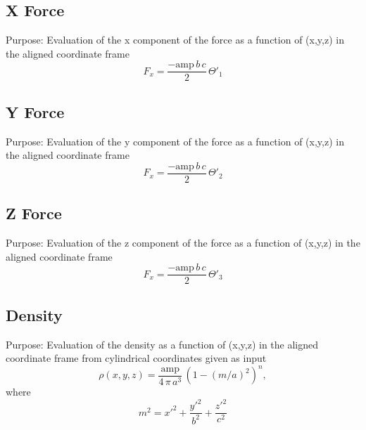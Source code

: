 \documentclass[a4paper,11pt]{article}
\begin{document}
		
		\subsection{X Force} %
			Purpose: Evaluation of the x component of the force as a function of (x,y,z) in the aligned coordinate frame \\
   		\begin{equation}
   		F_x = \frac{-\mathrm{amp}\,b\,c}{2}\,\Theta'_1
   		\end{equation}  
			

		\subsection{Y Force} %
			Purpose: Evaluation of the y component of the force as a function of (x,y,z) in the aligned coordinate frame \\
   		\begin{equation}
   		F_x = \frac{-\mathrm{amp}\,b\,c}{2}\,\Theta'_2
   		\end{equation}	
	   		
	
		
		\subsection{Z Force} %
			Purpose: Evaluation of the z component of the force as a function of (x,y,z) in the aligned coordinate frame \\
   		\begin{equation}
   		F_x = \frac{-\mathrm{amp}\,b\,c}{2}\,\Theta'_3
   		\end{equation}
	   			
	
		
		\subsection{Density} %
			Purpose: Evaluation of the density as a function of (x,y,z) in the aligned coordinate frame from cylindrical coordinates given as input\\
		\begin{equation}
		\rho(x,y,z) = \frac{\mathrm{amp}}{4\,\pi\,a^3}\,(1-(m/a)^2)^n,
		\end{equation}
		where
		\begin{equation}
		m^2 = x'^2 + \frac{y'^2}{b^2}+\frac{z'^2}{c^2}
		\end{equation}
			
\end{document}
